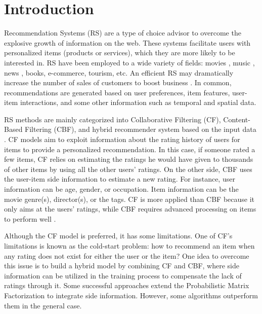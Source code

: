 \documentclass[a4paper,fleqn]{cas-dc}
\begin{document}
\maketitle

\section{Introduction}
\label{intro}
Recommendation Systems (RS) are a type of choice advisor to overcome the explosive growth of information on the web. These systems facilitate users with personalized items (products or services), which they are more likely to be interested in. RS have been employed to a wide variety of fields: movies \citep{01wei2016a, 02m2016a}, music \citep{03mao2016a, 04horsburgh2015a}, news \citep{05shi2016a, 06wang2015a}, books, e-commerce, tourism, etc. An efficient RS may dramatically increase the number of sales of customers to boost business \citep{07jannach2010a, 08ricci2015a}. In common, recommendations are generated based on user preferences, item features, user-item interactions, and some other information such as temporal and spatial data.

RS methods are mainly categorized into Collaborative Filtering (CF), Content-Based Filtering (CBF), and hybrid recommender system based on the input data \citep{09adomavicius2005a}. CF models \citep{10salah2016a, 11polatidis2016a, 12koren2015a} aim to exploit information about the rating history of users for items to provide a personalized recommendation. In this case, if someone rated a few items, CF relies on estimating the ratings he would have given to thousands of other items by using all the other users' ratings. On the other side, CBF uses the user-item side information to estimate a new rating. For instance, user information can be age, gender, or occupation. Item information can be the movie genre(s), director(s), or the tags. CF is more applied than CBF because it only aims at the users' ratings, while CBF requires advanced processing on items to perform well \citep{13lops2011a}.

Although the CF model is preferred, it has some limitations. One of CF's limitations is known as the cold-start problem: how to recommend an item when any rating does not exist for either the user or the item? One idea to overcome this issue is to build a hybrid model by combining CF and CBF, where side information can be utilized in the training process to compensate the lack of ratings through it. Some successful approaches extend the Probabilistic Matrix Factorization \citep{14adams2010a, 15salakhutdinov2008a} to integrate side information. However, some algorithms outperform them in the general case.
\end{document}
